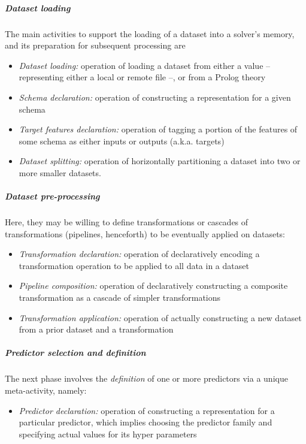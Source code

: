 \documentclass{article}
\begin{document}
\subparagraph{Dataset loading}
%
The main activities to support the loading of a dataset into a solver's memory, and its preparation for subsequent processing are
%
\begin{itemize}
    \item \emph{Dataset loading:} operation of loading a dataset from either a value -- representing either a local or remote file --, or from a Prolog theory
    \item \emph{Schema declaration:}  operation of constructing a representation for a given schema
    \item \emph{Target features declaration:} operation of tagging a portion of the features of some schema as either inputs or outputs (a.k.a. targets)
    \item \emph{Dataset splitting:} operation of horizontally partitioning a dataset into two or more smaller datasets.
\end{itemize}

\subparagraph{Dataset pre-processing}
%
Here, they may be willing to define transformations or cascades of transformations (pipelines, henceforth) to be eventually applied on datasets:
%
\begin{itemize}
    \item \emph{Transformation declaration:} operation of declaratively encoding a transformation operation to be applied to all data in a dataset
    \item \emph{Pipeline composition:} operation of declaratively constructing a composite transformation as a cascade of simpler transformations
    \item \emph{Transformation application:} operation of actually constructing a new dataset from a prior dataset and a transformation
\end{itemize}

\subparagraph{Predictor selection and definition}
%
The next phase involves the \emph{definition} of one or more predictors via a unique meta-activity, namely:
%
\begin{itemize}
    \item \emph{Predictor declaration:} operation of constructing a representation for a particular predictor, which implies choosing the predictor family and specifying actual values for its hyper parameters
\end{itemize}
\end{document}
